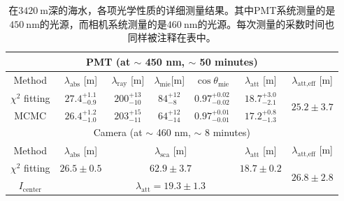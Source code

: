 \begin{table}[htpb]
\renewcommand{\arraystretch}{1.8}
\setlength{\arrayrulewidth}{0.15mm}
\setlength{\doublerulesep}{0.55mm}
\centering
    \begin{tabular}{|c|c|c|c|c|c|c|}
      \hline
      \multicolumn{7}{|c|}{PMT (at $\sim$ 450 nm, $\sim$ 50 minutes)} \\
      \hline
      Method & $\lambda_{\text{abs}}$ [m] & $\lambda_{\text{ray}}$ [m] & $\lambda_{\text{mie}} $[m] & $\cos \theta_{\text{mie}}$ & $\lambda_{\text{att}}$ [m] & $\lambda_{\text{att,eff}}$ [m] \\   
      \hline
      $\chi^2$ fitting & $ 27.4 ^{+1.1}_{-0.9}$ & $ 200 ^{+13}_{-10}$ & $ 84^{+12}_{-8}$ & $0.97 ^{+0.02}_{-0.02}$ & $18.7^{+3.0}_{-2.1}$ & \multirow{2}{*}{$25.2\pm 3.7$} \\ 
      \cline{1-6}
      MCMC & $26.4^{+1.2}_{-1.0}$ & $203^{+15}_{-11}$ & $64^{+12}_{-14}$ & $0.97^{+0.01}_{-0.01}$ & $17.2^{+0.8}_{-1.3}$ & {} \\
      \hline
      \multicolumn{7}{|c|}{Camera (at $\sim$ 460 nm, $\sim$ 8 minutes)} \\
      \hline
      Method & $\lambda_{\text{abs}}$ [m] & \multicolumn{3}{c|}{$\lambda_{\text{sca}}$ [m]} & $\lambda_{\text{att}}$ [m] & $\lambda_{\text{att,eff}}$ [m] \\ 
      \hline
      $\chi^2$ fitting & $26.5\pm0.5$ & \multicolumn{3}{c|}{$62.9\pm3.7$} & $18.7\pm0.2$ & \multirow{2}{*}{$26.8\pm 2.8$} \\ 
      \cline{1-6}
      $I_{\text{center}}$ &   \multicolumn{5}{c|}{$\lambda_{\text{att}} = 19.3 \pm 1.3$}  & {} \\
      \hline
    \end{tabular}
    
    \caption{在$3420~\mathrm{m}$深的海水，各项光学性质的详细测量结果。其中PMT系统测量的是$450~\mathrm{nm}$的光源，而相机系统测量的是$460~\mathrm{nm}$的光源。每次测量的采数时间也同样被注释在表中。}
    \label{tab:optical_property_blue}
\end{table}
